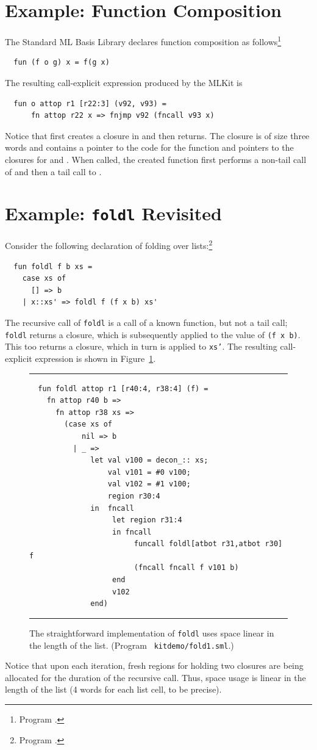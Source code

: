 \documentclass[12pt]{book}
\begin{document}
\section{Example: Function Composition}
The Standard ML Basis Library declares function composition as
follows\footnote{Program .}
\begin{verbatim}
  fun (f o g) x = f(g x)
\end{verbatim}
The resulting call-explicit expression produced by the MLKit is
\begin{verbatim}
  fun o attop r1 [r22:3] (v92, v93) =
      fn attop r22 x => fnjmp v92 (fncall v93 x)
\end{verbatim}
Notice that
%
 first creates a closure in  and then returns.
The closure is of size three words and contains a pointer to the code
for the function and pointers to the closures for  and
. When called, the created function first performs a non-tail
call of  and then a tail call to .

\section{Example: \texttt{foldl} Revisited}
\label{foldl.sec}
Consider the following declaration of folding over
lists:\footnote{Program .}
\begin{verbatim}
  fun foldl f b xs =
    case xs of
      [] => b
    | x::xs' => foldl f (f x b) xs'
\end{verbatim}
The recursive call of
%
{\tt foldl} is a call of a known function, but not a tail call; {\tt
  foldl} returns a closure, which is subsequently applied to the value
of {\tt (f x b)}. This too returns a closure, which in turn is applied
to {\tt xs'}.  The resulting call-explicit expression is shown in
Figure~\ref{fold1.fig}.
\begin{figure}
\hrule \medskip
\begin{verbatim}
  fun foldl attop r1 [r40:4, r38:4] (f) =
    fn attop r40 b =>
      fn attop r38 xs =>
        (case xs of
            nil => b
          | _ =>
              let val v100 = decon_:: xs;
                  val v101 = #0 v100;
                  val v102 = #1 v100;
                  region r30:4
              in  fncall
                   let region r31:4
                   in fncall
                        funcall foldl[atbot r31,atbot r30] f
                        (fncall fncall f v101 b)
                   end
                   v102
              end)
\end{verbatim}
\caption{The straightforward implementation of {\tt foldl} uses space
  linear in the length of the list. (Program {\tt
    kitdemo/fold1.sml}.)}
\medskip \hrule \label{fold1.fig}
\end{figure}
Notice that upon each iteration, fresh regions for holding two
closures are being allocated for the duration of the recursive call.
Thus, space usage is linear in the length of the list (4 words for
each list cell, to be precise).
\end{document}
